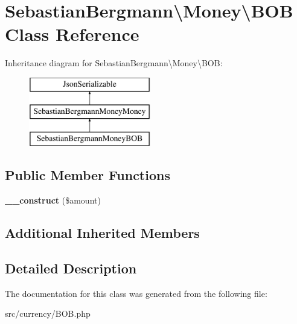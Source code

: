 \hypertarget{classSebastianBergmann_1_1Money_1_1BOB}{}\section{Sebastian\+Bergmann\textbackslash{}Money\textbackslash{}B\+O\+B Class Reference}
\label{classSebastianBergmann_1_1Money_1_1BOB}
Inheritance diagram for Sebastian\+Bergmann\textbackslash{}Money\textbackslash{}B\+O\+B\+:\begin{figure}[H]
\begin{center}
\leavevmode
\includegraphics[height=3.000000cm]{classSebastianBergmann_1_1Money_1_1BOB}
\end{center}
\end{figure}
\subsection*{Public Member Functions}
\begin{DoxyCompactItemize}
\item 
\hypertarget{classSebastianBergmann_1_1Money_1_1BOB_a058b129926d07b2b0e9ca6d7cfe5b469}{}{\bfseries \+\_\+\+\_\+construct} (\$amount)\label{classSebastianBergmann_1_1Money_1_1BOB_a058b129926d07b2b0e9ca6d7cfe5b469}

\end{DoxyCompactItemize}
\subsection*{Additional Inherited Members}


\subsection{Detailed Description}


The documentation for this class was generated from the following file\+:\begin{DoxyCompactItemize}
\item 
src/currency/B\+O\+B.\+php\end{DoxyCompactItemize}
